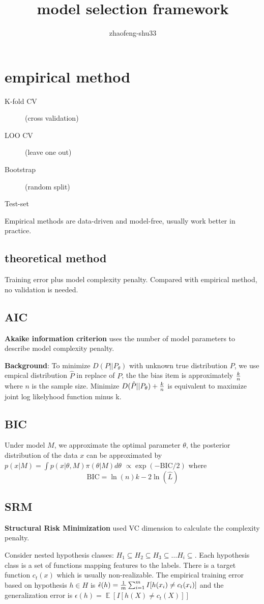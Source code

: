 \documentclass{article}
\DeclareMathOperator\E{\mathbb{E}}
\begin{document}
\title{model selection framework}
\author{zhaofeng-shu33}
\maketitle
\section{empirical method}
\begin{description}
\item[K-fold CV] (cross validation)
\item[LOO CV] (leave one out)
\item[Bootstrap] (random split)
\item[Test-set]
\end{description}
Empirical methods are data-driven and model-free, usually work better in practice.
\subsection{theoretical method}
Training error plus model complexity penalty. Compared with empirical method, no validation is needed.
\subsection{AIC}
\textbf{Akaike information criterion} uses the number of model parameters to describe
model complexity penalty.

\textbf{Background}: To minimize $D(P || P_{\theta})$ with unknown true distribution $P$,
we use empical distribution $\hat{P}$ in replace 
of $P$, the the bias item is approximately ${k \over n}$ where $n$ is the sample size. 
Minimize $D(\hat{P} || P_{\theta}) + { k \over n}$ is equivalent to maximize joint log likelyhood function minus k.
\subsection{BIC}
Under model $M$, we approximate the optimal parameter $\theta$, the posterior distribution of the data $x$ can be approximated by $ p(x | M) = \int p(x | \theta, M) \pi(\theta | M) d\theta  $
$\propto \exp(-\mathrm{BIC}/2) $ where 
\begin{equation}
\mathrm{BIC} = \ln(n) k - 2 \ln (\widehat{L} )
\end{equation}
\subsection{SRM}
\textbf{Structural Risk Minimization} used VC dimension to calculate the complexity penalty.

Consider nested hypothesis classes: $ H_1 \subseteq H_2 \subseteq H_3 \subseteq \dots H_i \subseteq $. Each hypothesis class
is a set of functions mapping features to the labels.
There is a target function $c_t(x)$ which is usually non-realizable. The empirical training error based on hypothesis $h \in H$ is $\hat{\epsilon}(h) = {1 \over m} \sum_{i=1}^m I [ h(x_i) \neq c_t(x_i) ] $ and the generalization error is $ \epsilon(h) = \E [ I [ h(X) \neq c_t(X) ] ]$
\end{document}
